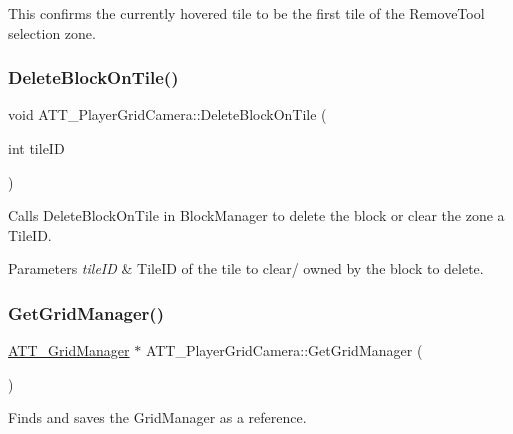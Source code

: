 This confirms the currently hovered tile to be the first tile of the Remove\+Tool selection zone. 

\mbox{\label{class_a_t_t___player_grid_camera_a4ee51f1a11796e95ddef813ba85f101e}} 
\subsubsection{\texorpdfstring{DeleteBlockOnTile()}{DeleteBlockOnTile()}}
{\footnotesize\ttfamily void A\+T\+T\+\_\+\+Player\+Grid\+Camera\+::\+Delete\+Block\+On\+Tile (\begin{DoxyParamCaption}\item[{int}]{tile\+ID }\end{DoxyParamCaption})\hspace{0.3cm}{\ttfamily [protected]}}



Calls Delete\+Block\+On\+Tile in Block\+Manager to delete the block or clear the zone a Tile\+ID. 


\begin{DoxyParams}{Parameters}
{\em tile\+ID} & Tile\+ID of the tile to clear/ owned by the block to delete. \\
\hline
\end{DoxyParams}
\mbox{\label{class_a_t_t___player_grid_camera_ae4c11bb7a68a06a9f95e445db9ccc69f}} 
\subsubsection{\texorpdfstring{GetGridManager()}{GetGridManager()}}
{\footnotesize\ttfamily \mbox{\hyperlink{class_a_t_t___grid_manager}{A\+T\+T\+\_\+\+Grid\+Manager}} $\ast$ A\+T\+T\+\_\+\+Player\+Grid\+Camera\+::\+Get\+Grid\+Manager (\begin{DoxyParamCaption}{ }\end{DoxyParamCaption})\hspace{0.3cm}{\ttfamily [protected]}}



Finds and saves the Grid\+Manager as a reference. 

